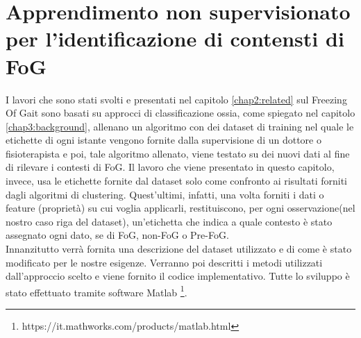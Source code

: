 

\chapter[Apprendimento non supervisionato]{Apprendimento non supervisionato per l'identificazione di contensti di FoG}\label{chap5:Automatic}
I lavori che sono stati svolti e presentati nel capitolo \ref{chap2:related} sul Freezing Of Gait sono basati su approcci di classificazione ossia, come spiegato nel capitolo \ref{chap3:background}, allenano un algoritmo con dei dataset di training nel quale le etichette di ogni istante vengono fornite dalla supervisione di un dottore o fisioterapista e poi, tale algoritmo allenato, viene testato su dei nuovi dati al fine di rilevare i contesti di FoG. Il lavoro che viene presentato in questo capitolo, invece, usa le etichette fornite dal dataset solo come confronto ai risultati forniti dagli algoritmi di clustering. Quest'ultimi, infatti, una volta forniti i dati o feature (proprietà) su cui voglia applicarli, restituiscono, per ogni osservazione(nel nostro caso riga del dataset), un'etichetta che indica a quale contesto è stato assegnato ogni dato, se di FoG, non-FoG o Pre-FoG.\\
Innanzitutto verrà fornita una descrizione del dataset utilizzato e di come è stato modificato per le nostre esigenze. Verranno poi descritti i metodi utilizzati dall'approccio scelto e viene fornito il codice implementativo. Tutte lo sviluppo è stato effettuato tramite software Matlab \footnote{https://it.mathworks.com/products/matlab.html}.
